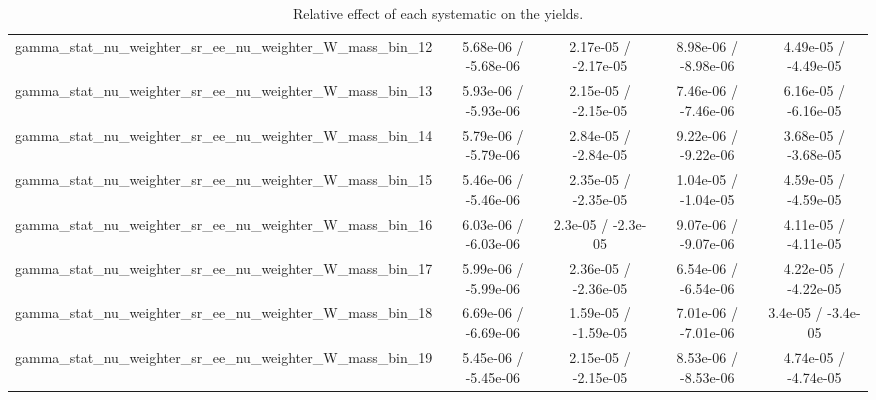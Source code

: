 \documentclass[10pt]{article}
\begin{document}
\begin{table}[htbp]
\begin{center}
\begin{tabular}{|c|c|c|c|c|}
  gamma_stat_nu_weighter_sr_ee_nu_weighter_W_mass_bin_12 & 5.68e-06 / -5.68e-06 & 2.17e-05 / -2.17e-05 & 8.98e-06 / -8.98e-06 & 4.49e-05 / -4.49e-05 \\ 
  gamma_stat_nu_weighter_sr_ee_nu_weighter_W_mass_bin_13 & 5.93e-06 / -5.93e-06 & 2.15e-05 / -2.15e-05 & 7.46e-06 / -7.46e-06 & 6.16e-05 / -6.16e-05 \\ 
  gamma_stat_nu_weighter_sr_ee_nu_weighter_W_mass_bin_14 & 5.79e-06 / -5.79e-06 & 2.84e-05 / -2.84e-05 & 9.22e-06 / -9.22e-06 & 3.68e-05 / -3.68e-05 \\ 
  gamma_stat_nu_weighter_sr_ee_nu_weighter_W_mass_bin_15 & 5.46e-06 / -5.46e-06 & 2.35e-05 / -2.35e-05 & 1.04e-05 / -1.04e-05 & 4.59e-05 / -4.59e-05 \\ 
  gamma_stat_nu_weighter_sr_ee_nu_weighter_W_mass_bin_16 & 6.03e-06 / -6.03e-06 & 2.3e-05 / -2.3e-05 & 9.07e-06 / -9.07e-06 & 4.11e-05 / -4.11e-05 \\ 
  gamma_stat_nu_weighter_sr_ee_nu_weighter_W_mass_bin_17 & 5.99e-06 / -5.99e-06 & 2.36e-05 / -2.36e-05 & 6.54e-06 / -6.54e-06 & 4.22e-05 / -4.22e-05 \\ 
  gamma_stat_nu_weighter_sr_ee_nu_weighter_W_mass_bin_18 & 6.69e-06 / -6.69e-06 & 1.59e-05 / -1.59e-05 & 7.01e-06 / -7.01e-06 & 3.4e-05 / -3.4e-05 \\ 
  gamma_stat_nu_weighter_sr_ee_nu_weighter_W_mass_bin_19 & 5.45e-06 / -5.45e-06 & 2.15e-05 / -2.15e-05 & 8.53e-06 / -8.53e-06 & 4.74e-05 / -4.74e-05 \\ 
\hline 
\end{tabular} 
\caption{Relative effect of each systematic on the yields.} 
\end{center} 
\end{table} 
\end{document}
